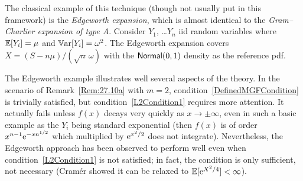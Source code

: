 \begin{example}\label{Ex:27.10a}
The classical example of this technique (though not usually put in this framework)
is the \emph{Edgeworth expansion}, which is almost identical to the \emph{Gram--Charlier expansion of type A}.
Consider $Y_1$, \dots $Y_n$ iid random variables where $\operatorname{{\mathbb E}}[Y_i]=\mu$ and $\operatorname{\mathbb{V}\mathrm{ar}}[Y_i]=\omega^2$.
The Edgeworth expansion covers $X=(S-n\mu)/(\sqrt{n}\,\omega)$ with the $\mathsf{Normal}(0,1)$ density as the reference pdf.

The Edgeworth example illustrates well several aspects of the theory. In the scenario of Remark~\ref{Rem:27.10a} with $m=2$, condition~\eqref{DefinedMGFCondition} is trivially satisfied,
but condition~\eqref{L2Condition1} requires more attention. It actually fails unless
$f(x)$ decays very quickly as $x \to\pm \infty$, even in such a basic example as the $Y_i$
being standard exponential (then $f(x)$ is of order $x^{n-1} \mathrm{e}^{-xn^{1/2}}$
which multiplied by $\mathrm{e}^{x^2/2}$ does not integrate). Nevertheless, the Edgeworth approach
has been observed to perform well even when condition~\eqref{L2Condition1} is not satisfied;
in fact, the condition is only sufficient, not necessary (Cram{\'e}r \cite{cramer1926some} showed it can be relaxed to
$\operatorname{{\mathbb E}} [\mathrm{e}^{X^2/4}]<\infty$).
\remQED
\end{example}


